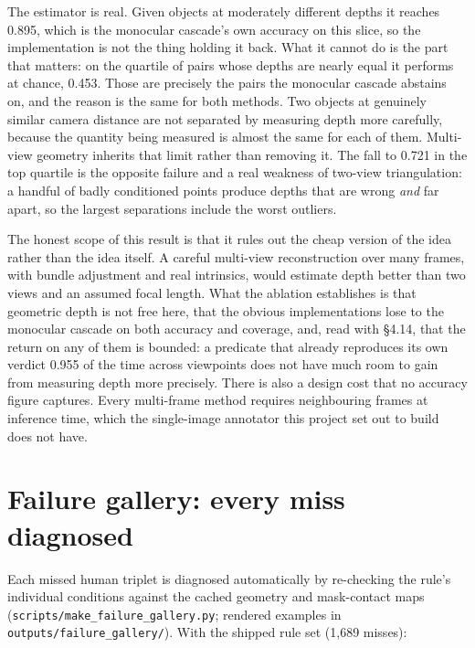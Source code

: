 The estimator is real. Given objects at moderately different depths it reaches 0.895, which is the monocular cascade's own accuracy on this slice, so the implementation is not the thing holding it back. What it cannot do is the part that matters: on the quartile of pairs whose depths are nearly equal it performs at chance, 0.453. Those are precisely the pairs the monocular cascade abstains on, and the reason is the same for both methods. Two objects at genuinely similar camera distance are not separated by measuring depth more carefully, because the quantity being measured is almost the same for each of them. Multi-view geometry inherits that limit rather than removing it. The fall to 0.721 in the top quartile is the opposite failure and a real weakness of two-view triangulation: a handful of badly conditioned points produce depths that are wrong \textit{and} far apart, so the largest separations include the worst outliers.

The honest scope of this result is that it rules out the cheap version of the idea rather than the idea itself. A careful multi-view reconstruction over many frames, with bundle adjustment and real intrinsics, would estimate depth better than two views and an assumed focal length. What the ablation establishes is that geometric depth is not free here, that the obvious implementations lose to the monocular cascade on both accuracy and coverage, and, read with \S4.14, that the return on any of them is bounded: a predicate that already reproduces its own verdict 0.955 of the time across viewpoints does not have much room to gain from measuring depth more precisely. There is also a design cost that no accuracy figure captures. Every multi-frame method requires neighbouring frames at inference time, which the single-image annotator this project set out to build does not have.

\section{Failure gallery: every miss diagnosed}

Each missed human triplet is diagnosed automatically by re-checking the rule's individual conditions against the cached geometry and mask-contact maps (\texttt{scripts/make\_failure\_gallery.py}; rendered examples in \texttt{outputs/failure\_gallery/}). With the shipped rule set (1,689 misses):

